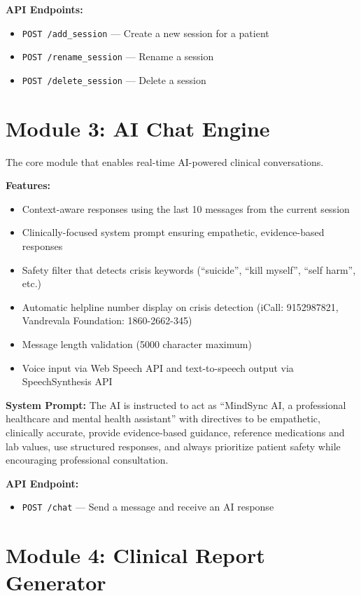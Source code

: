 \documentclass[12pt,a4paper]{report}
\begin{document}
\textbf{API Endpoints:}
\begin{itemize}
    \item \texttt{POST /add\_session} --- Create a new session for a patient
    \item \texttt{POST /rename\_session} --- Rename a session
    \item \texttt{POST /delete\_session} --- Delete a session
\end{itemize}

\section{Module 3: AI Chat Engine}

The core module that enables real-time AI-powered clinical conversations.

\textbf{Features:}
\begin{itemize}
    \item Context-aware responses using the last 10 messages from the current session
    \item Clinically-focused system prompt ensuring empathetic, evidence-based responses
    \item Safety filter that detects crisis keywords (``suicide'', ``kill myself'', ``self harm'', etc.)
    \item Automatic helpline number display on crisis detection (iCall: 9152987821, Vandrevala Foundation: 1860-2662-345)
    \item Message length validation (5000 character maximum)
    \item Voice input via Web Speech API and text-to-speech output via SpeechSynthesis API
\end{itemize}

\textbf{System Prompt:}
The AI is instructed to act as ``MindSync AI, a professional healthcare and mental health assistant'' with directives to be empathetic, clinically accurate, provide evidence-based guidance, reference medications and lab values, use structured responses, and always prioritize patient safety while encouraging professional consultation.

\textbf{API Endpoint:}
\begin{itemize}
    \item \texttt{POST /chat} --- Send a message and receive an AI response
\end{itemize}

\section{Module 4: Clinical Report Generator}
\end{document}
